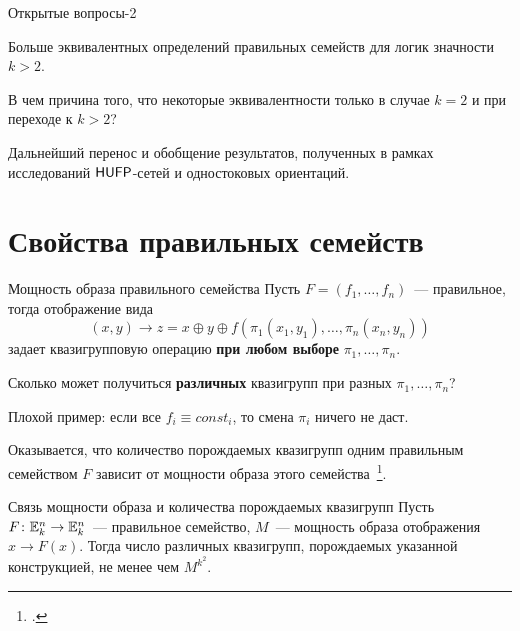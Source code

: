 \begin{frame}{Открытые вопросы-2}
    \begin{coloritemize}
        \item Больше эквивалентных определений правильных семейств для логик значности $k > 2$.
        \pause 
        \item В чем  причина того, что некоторые эквивалентности   только в случае $k = 2$ и   при переходе к $k > 2$?
        \pause 
        \item Дальнейший перенос и обобщение результатов, полученных в рамках исследований $\mathsf{HUFP}$-сетей и одностоковых ориентаций.
    \end{coloritemize}
\end{frame}


\section{Свойства правильных семейств}


\begin{frame}{Мощность образа правильного семейства}
    Пусть $F = (f_1, \ldots, f_n)$~--- правильное, тогда отображение вида 
    \[
        (x, y) \to z = x \oplus y \oplus f(\pi_1(x_1, y_1), \ldots, \pi_n(x_n, y_n))
    \]
    задает квазигрупповую операцию \textbf{при любом выборе} $\pi_1, \ldots, \pi_n$.
    \pause 
    \begin{coloritemize}
        \item Сколько может получиться \textbf{различных} квазигрупп при разных $\pi_1, \ldots, \pi_n$?
        \pause 
        \item Плохой пример: если все $f_i \equiv const_i$, то смена $\pi_i$ ничего не даст.
        \pause
        \item Оказывается, что количество порождаемых квазигрупп одним правильным семейством $F$ зависит от мощности образа этого семейства~\footcite{galatenko23}.
    \end{coloritemize}
    \begin{myexample}{Связь мощности образа и количества порождаемых квазигрупп}
        Пусть $F \colon \mathbb{E}_k^n \to \mathbb{E}_k^n$~--- правильное семейство, $M$~--- мощность образа отображения $x \to F(x)$.
        Тогда число различных квазигрупп, порождаемых указанной конструкцией, не менее чем $M^{k^2}$.
    \end{myexample}
\end{frame}


